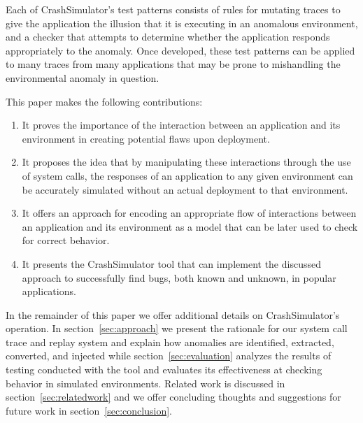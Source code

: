 Each of CrashSimulator's test patterns consists of rules for
mutating traces to give the application the illusion that it is
executing in an anomalous environment, and a checker that attempts to
determine whether the application responds appropriately to the
anomaly.  Once developed, these test patterns can be applied to many
traces from many applications that may be prone to mishandling the
environmental anomaly in question.


This paper makes the following contributions:

\begin{enumerate}
\item{It proves the importance of the interaction between an application and
    its environment in creating potential flaws upon deployment.}
\item{It proposes the idea that by manipulating these interactions through
    the use of system calls, the responses of an application to any given
    environment can be accurately simulated without an actual deployment to
    that environment.}
\item{It offers an approach for encoding an appropriate flow of
    interactions between an application and its environment as a model that
    can be later used to check for correct behavior.}
\item{It presents the CrashSimulator tool that can implement the
    discussed approach to successfully find bugs, both known and unknown,
    in popular applications.}
\end{enumerate}

In the remainder of this paper we
offer additional details on CrashSimulator's operation.
In section~\ref{sec:approach} we present the rationale for our system call trace
and replay system and explain how anomalies are identified, extracted,
converted, and injected while section~\ref{sec:evaluation} analyzes the results
of testing conducted with the tool and evaluates its effectiveness at checking
behavior in simulated environments.  Related work is discussed in
section~\ref{sec:relatedwork} and we offer concluding thoughts and suggestions
for future work in section~\ref{sec:conclusion}.


